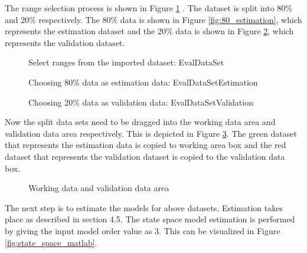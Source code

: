 \documentclass[article,type=msc,colorback,12pt,accentcolor=tud8b,table]{tudthesis}
\begin{document}
The range selection process is shown in Figure \ref{fig:select_range_estimation_validation} . The dataset is split into 80\% and 20\% respectively. The 80\% data is shown in Figure \ref{fig:80_estimation}, which represents the estimation dataset and the 20\% data is shown in Figure \ref{fig:20_validation}, which represents the validation dataset. 

\begin{figure}[H]
	\begin{center}
		\makebox[\textwidth]{\texttt{[image: E7]}}
	\end{center}
	\caption{Select ranges from the imported dataset: EvalDataSet}
		\label{fig:select_range_estimation_validation}
\end{figure}


  \begin{figure}[H]
	  	  	  	\begin{center}
	  	  	  		\makebox[\textwidth]{\texttt{[image: E8]}}
	  	  	  	\end{center}
	  	  	  	\caption{Choosing 80\% data as estimation data: EvalDataSetEstimation}
					\label{fig:80_estimation}
    	\begin{center}
    		\makebox[\textwidth]{\texttt{[image: E9]}}
    	\end{center}
    	\caption{Choosing 20\% data as validation data: EvalDataSetValidation}
    	\label{fig:20_validation}
    \end{figure}	
	
	Now the split data sets need to be dragged into the working data area and validation data area respectively. This is depicted in Figure \ref{fig:working_validation_area}. The green dataset that represents the estimation data is copied to working area box and the red dataset that represents the validation dataset is copied to the validation data box.
	
	    \begin{figure}[H]
	    	\begin{center}
	    		\makebox[\textwidth]{\texttt{[image: E10]}}
	    	\end{center}
	    	\caption{Working data and validation data area}
	    		\label{fig:working_validation_area}
	    \end{figure}
	
	The next step is to estimate the models for above datasets. Estimation takes place as described in section 4.5. The state space model estimation is performed by giving the input model order value as 3. This can be visualized in Figure \ref{fig:state_space_matlab}.
	
\end{document}
